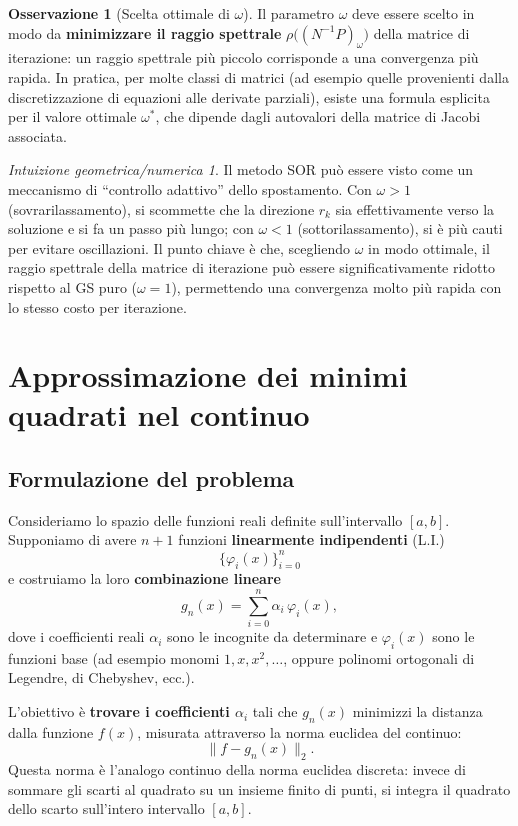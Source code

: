 \documentclass[a4paper,12pt]{article}
\theoremstyle{definition}
\newtheorem{osservazione}{Osservazione}[section]
\theoremstyle{remark}
\newtheorem*{intuizione}{Intuizione geometrica/numerica}
\begin{document}
\begin{osservazione}[Scelta ottimale di $\omega$]
Il parametro $\omega$ deve essere scelto in modo da \textbf{minimizzare
il raggio spettrale} $\rho\bigl((N^{-1}P)_\omega\bigr)$ della matrice di
iterazione: un raggio spettrale più piccolo corrisponde a una convergenza
più rapida.
In pratica, per molte classi di matrici (ad esempio quelle provenienti
dalla discretizzazione di equazioni alle derivate parziali), esiste una
formula esplicita per il valore ottimale $\omega^*$, che dipende
dagli autovalori della matrice di Jacobi associata.
\end{osservazione}

\begin{intuizione}
Il metodo SOR può essere visto come un meccanismo di ``controllo
adattivo'' dello spostamento.
Con $\omega > 1$ (sovrarilassamento), si scommette che la direzione
$r_k$ sia effettivamente verso la soluzione e si fa un passo più lungo;
con $\omega < 1$ (sottorilassamento), si è più cauti per evitare
oscillazioni.
Il punto chiave è che, scegliendo $\omega$ in modo ottimale, il raggio
spettrale della matrice di iterazione può essere significativamente
ridotto rispetto al GS puro ($\omega = 1$), permettendo una convergenza
molto più rapida con lo stesso costo per iterazione.
\end{intuizione}


\section{Approssimazione dei minimi quadrati nel continuo}

\subsection{Formulazione del problema}

Consideriamo lo spazio delle funzioni reali definite sull'intervallo
$[a,b]$. Supponiamo di avere $n+1$ funzioni \textbf{linearmente
indipendenti} (L.I.)
\[
  \{\varphi_i(x)\}_{i=0}^{n}
\]
e costruiamo la loro \textbf{combinazione lineare}
\[
  g_n(x) = \sum_{i=0}^{n} \alpha_i\,\varphi_i(x),
\]
dove i coefficienti reali $\alpha_i$ sono le incognite da determinare e
$\varphi_i(x)$ sono le funzioni base (ad esempio monomi $1,x,x^2,\ldots$,
oppure polinomi ortogonali di Legendre, di Chebyshev, ecc.).

L'obiettivo è \textbf{trovare i coefficienti $\alpha_i$} tali che
$g_n(x)$ minimizzi la distanza dalla funzione $f(x)$, misurata
attraverso la norma euclidea del continuo:
\[
  \|f - g_n(x)\|_2.
\]
Questa norma è l'analogo continuo della norma euclidea discreta: invece
di sommare gli scarti al quadrato su un insieme finito di punti, si
integra il quadrato dello scarto sull'intero intervallo $[a,b]$.
\end{document}
